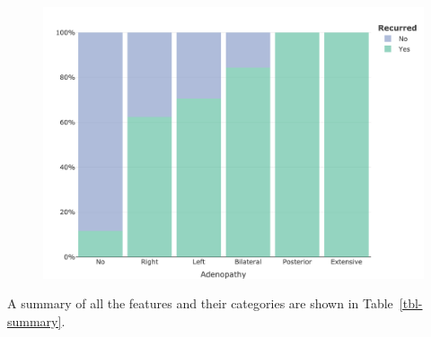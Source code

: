 \documentclass[
  letterpaper,
  DIV=11,
  numbers=noendperiod]{scrartcl}
\begin{document}
\begin{figure}
	\centering
		\includegraphics[width=0.8\linewidth]{images/aden_dist_plot.png}
		\label{fig-aden-dist}
\end{figure}

A summary of all the features and their categories are shown in
Table~\ref{tbl-summary}.
\end{document}
